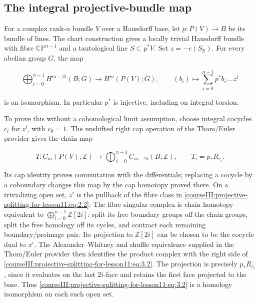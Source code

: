 \subsection{The integral projective-bundle map}
\label{courseIII:projective-splitting-for-lesson11:projective-module}

\label{courseIII:projective-splitting-for-lesson11:section-3}\label{courseIII:projective-splitting-for-lesson11:CG-S6-PROJECTIVE-3}

For a complex rank-\(n\) bundle \(V\) over a Hausdorff base, let \(p:P(V)\to B\) be its bundle of lines. The chart construction gives a locally trivial Hausdorff bundle with fibre \(\mathbb{CP}^{n-1}\) and a tautological line \(S\subset p^*V\). Set \(z=-e(S_{\mathbb R})\). For every abelian group \(G\), the map

\begin{equation}
\bigoplus_{i=0}^{n-1}H^{m-2i}(B;G)\longrightarrow H^m(P(V);G),\qquad
(b_i)\longmapsto\sum_{i=0}^{n-1}p^*b_i\smile z^i
\label{courseIII:projective-splitting-for-lesson11:eq:3.1}
\end{equation}

is an isomorphism. In particular \(p^*\) is injective, including on integral torsion.

To prove this without a cohomological limit assumption, choose integral cocycles \(c_i\) for \(z^i\), with \(c_0=1\). The unshifted right cap operation of the Thom/Euler provider gives the chain map

\begin{equation}
T:C_m(P(V);\mathbb Z)\longrightarrow\bigoplus_{i=0}^{n-1}C_{m-2i}(B;\mathbb Z),
\qquad T_i=p_*R_{c_i}.
\label{courseIII:projective-splitting-for-lesson11:eq:3.2}
\end{equation}

Its cap identity proves commutation with the differentials; replacing a cocycle by a coboundary changes this map by the cap homotopy proved there. On a trivializing open set, \(z^i\) is the pullback of the fibre class in \eqref{courseIII:projective-splitting-for-lesson11:eq:2.2}. The fibre singular complex is chain homotopy equivalent to \(\bigoplus_{i=0}^{n-1}\mathbb Z[2i]\): split its free boundary groups off the chain groups, split the free homology off its cycles, and contract each remaining boundary/preimage pair. Its projection to \(\mathbb Z[2i]\) can be chosen to be the cocycle dual to \(x^i\). The Alexander--Whitney and shuffle equivalence supplied in the Thom/Euler provider then identifies the product complex with the right side of \eqref{courseIII:projective-splitting-for-lesson11:eq:3.2}. The projection is precisely \(p_*R_{c_i}\), since it evaluates on the last \(2i\)-face and retains the first face projected to the base. Thus \eqref{courseIII:projective-splitting-for-lesson11:eq:3.2} is a homology isomorphism on each such open set.

